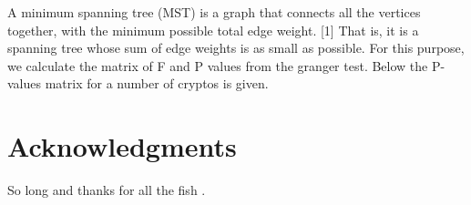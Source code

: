 \documentclass[fleqn,10pt]{SelfArx} %
\begin{document}
A minimum spanning tree (MST) is a graph that connects all the vertices together, with the minimum possible total edge weight. [1] That is, it is a spanning tree whose sum of edge weights is as small as possible. For this purpose, we calculate the matrix of F and P values from the granger test. Below the P-values matrix for a number of cryptos is given. 


\section*{Acknowledgments} %


So long and thanks for all the fish \cite{Figueredo:2009dg, Smith:2012qr}.





\end{document}
